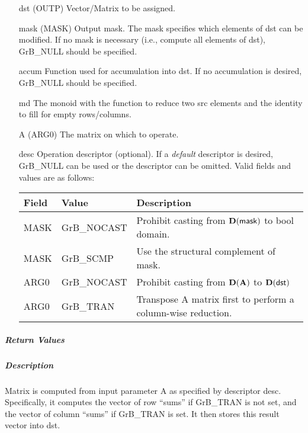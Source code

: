 \begin{itemize}[leftmargin=1.1in]
    \item[{\sf dst}]   ({\sf OUTP}) Vector/Matrix to be assigned.

    \item[{\sf mask}] ({\sf MASK}) Output mask. The mask specifies which elements
    of {\sf dst} can be modified. If no mask is necessary (i.e., compute all
    elements of {\sf dst}), {\sf GrB\_NULL} should be specified.

    \item[{\sf accum}] Function used for accumulation into {\sf dst}.  If no accumulation
                        is desired, {\sf GrB\_NULL} should be specified.

    \item[{\sf md}]    The monoid with the function to reduce two src elements and the identity to fill for empty rows/columns.
    \item[{\sf A}]     ({\sf ARG0}) The matrix on which to operate.

    \item[{\sf desc}]   Operation descriptor (optional). If a
    \emph{default} descriptor is desired, {\sf GrB\_NULL} can be
    used or the descriptor can be omitted.  Valid fields and values are as follows: \\
    \begin{tabular}{lll}
    Field  & Value & Description \\
    \hline
    {\sf MASK} & {\sf GrB\_NOCAST} & Prohibit casting from $\bold{D}({\sf mask})$ to {\sf bool} domain. \\
    {\sf MASK} & {\sf GrB\_SCMP} & Use the structural complement of {\sf mask}. \\
    {\sf ARG0} & {\sf GrB\_NOCAST} & Prohibit casting from $\bold{D}({\bf A})$ to $\bold{D}({\sf dst})$ \\
    {\sf ARG0} & {\sf GrB\_TRAN} & Transpose {\sf A} matrix first to perform a 
    column-wise reduction. \\
    \end{tabular}

\end{itemize}

\subparagraph{Return Values}

\subparagraph{Description}

Matrix  is computed from
input parameter {\sf A} as specified
by descriptor {\sf desc}. Specifically, it computes the vector of row ``sums'' if GrB\_TRAN is not set, and
the vector of column ``sums'' if GrB\_TRAN  is set. It then stores this result vector into {\sf dst}. 

